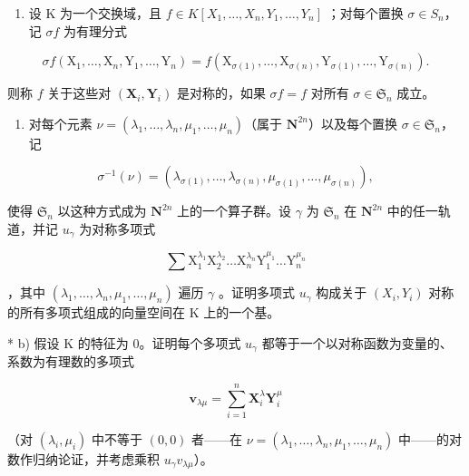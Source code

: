 \begin{enumerate}
\def\labelenumi{\arabic{enumi})}
\setcounter{enumi}{4}
\tightlist
\item
  设 K 为一个交换域，且 \(f \in K[X_{1}, \ldots, X_{n}, Y_{1}, \ldots, Y_{n}]\) ；对每个置换 \(\sigma \in S_{n}\)，记 \(\sigma f\) 为有理分式
\end{enumerate}

\[
\sigma f \left(\mathrm{X} _ {1}, \dots , \mathrm{X} _ {n}, \mathrm{Y} _ {1}, \dots , \mathrm{Y} _ {n}\right) = f \left(\mathrm{X} _ {\sigma (1)}, \dots , \mathrm{X} _ {\sigma (n)}, \mathrm{Y} _ {\sigma (1)}, \dots , \mathrm{Y} _ {\sigma (n)}\right).
\]

则称 \(f\) 关于这些对 \((\mathbf{X}_i, \mathbf{Y}_i)\) 是对称的，如果 \(\sigma f = f\) 对所有 \(\sigma \in \mathfrak{S}_n\) 成立。

\begin{enumerate}
\def\labelenumi{\alph{enumi})}
\tightlist
\item
  对每个元素 \(\nu = (\lambda_1, \ldots, \lambda_n, \mu_1, \ldots, \mu_n)\)（属于 \(\mathbf{N}^{2n}\)）以及每个置换 \(\sigma \in \mathfrak{S}_n\)，记
\end{enumerate}

\[
\sigma^ {- 1} (\nu) = \left(\lambda_ {\sigma (1)}, \dots , \lambda_ {\sigma (n)}, \mu_ {\sigma (1)}, \dots , \mu_ {\sigma (n)}\right),
\]

使得 \(\mathfrak{S}_n\) 以这种方式成为 \(\mathbf{N}^{2n}\) 上的一个算子群。设 \(\gamma\) 为 \(\mathfrak{S}_n\) 在 \(\mathbf{N}^{2n}\) 中的任一轨道，并记 \(u_{\gamma}\) 为对称多项式

\[
\sum \mathrm{X} _ {1} ^ {\lambda_ {1}} \mathrm{X} _ {2} ^ {\lambda_ {2}} \dots \mathrm{X} _ {n} ^ {\lambda_ {n}} \mathrm{Y} _ {1} ^ {\mu_ {1}} \dots \mathrm{Y} _ {n} ^ {\mu_ {n}}
\]

，其中 \((\lambda_{1},\ldots,\lambda_{n},\mu_{1},\ldots,\mu_{n})\) 遍历 \(\gamma\) 。证明多项式 \(u_{\gamma}\) 构成关于 \((X_{i},Y_{i})\) 对称的所有多项式组成的向量空间在 K 上的一个基。

* b) 假设 K 的特征为 0。证明每个多项式 \(u_{\gamma}\) 都等于一个以对称函数为变量的、系数为有理数的多项式

\[
\boldsymbol {v} _ {\lambda \mu} = \sum_ {i = 1} ^ {n} \mathbf {X} _ {i} ^ {\lambda} \mathbf {Y} _ {i} ^ {\mu}
\]

（对 \((\lambda_i, \mu_i)\) 中不等于 \((0, 0)\) 者——在 \(\nu = (\lambda_1, \ldots, \lambda_n, \mu_1, \ldots, \mu_n)\) 中——的对数作归纳论证，并考虑乘积 \(u_\gamma v_{\lambda \mu}\)）。

